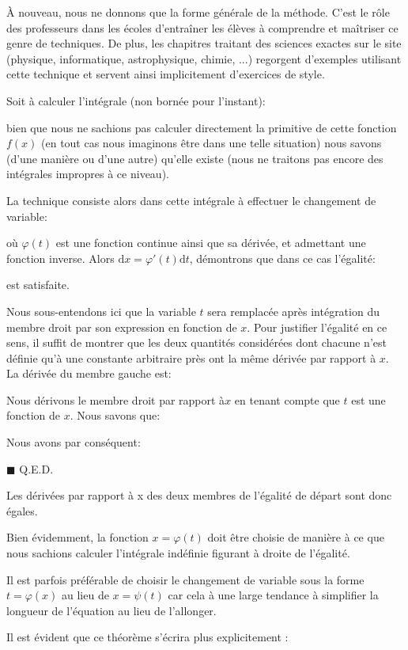 	À nouveau, nous ne donnons que la forme générale de la méthode. C'est le rôle des professeurs dans les écoles d'entraîner les élèves à comprendre et maîtriser ce genre de techniques. De plus, les chapitres traitant des sciences exactes sur le site (physique, informatique, astrophysique, chimie, ...) regorgent d'exemples utilisant cette technique et servent ainsi implicitement d'exercices de style.

	Soit à calculer l'intégrale (non bornée pour l'instant):
	
	bien que nous ne sachions pas calculer directement la primitive de cette fonction $f(x)$ (en tout cas nous imaginons être dans une telle situation) nous savons (d'une manière ou d'une autre) qu'elle existe (nous ne traitons pas encore des intégrales impropres à ce niveau).

	La technique consiste alors dans cette intégrale à effectuer le changement de variable:
	
	où $\varphi (t)$ est une fonction continue ainsi que sa dérivée, et admettant une fonction inverse. Alors $\mathrm{d}x=\varphi' (t)\mathrm{d}t$, démontrons que dans ce cas l'égalité:
	
	est satisfaite.
	\begin{dem}
	Nous sous-entendons ici que la variable $t$ sera remplacée après intégration du membre droit par son expression en fonction de $x$. Pour justifier l'égalité en ce sens, il suffit de montrer que les deux quantités considérées dont chacune n'est définie qu'à une constante arbitraire près ont la même dérivée par rapport à $x$. La dérivée du membre gauche est:
	
	Nous dérivons le membre droit par rapport à$x$ en tenant compte que $t$ est une fonction de $x$. Nous savons que:
	
	Nous avons par conséquent:
	
	\begin{flushright}
		$\blacksquare$  Q.E.D.
	\end{flushright}
	\end{dem}
	Les dérivées par rapport à x des deux membres de l'égalité de départ sont donc égales.
	
	Bien évidemment, la fonction $x=\varphi (t)$ doit être choisie de manière à ce que nous sachions calculer l'intégrale indéfinie figurant à droite de l'égalité.
	
	\begin{tcolorbox}[title=Remarque,colframe=black,arc=10pt]
	Il est parfois préférable de choisir le changement de variable sous la forme $t=\varphi (x)$ au lieu de $x= \psi(t)$ car cela à une large tendance à simplifier la longueur de l'équation au lieu de l'allonger.
	\end{tcolorbox}
	Il est évident que ce théorème s'écrira plus explicitement :
	
